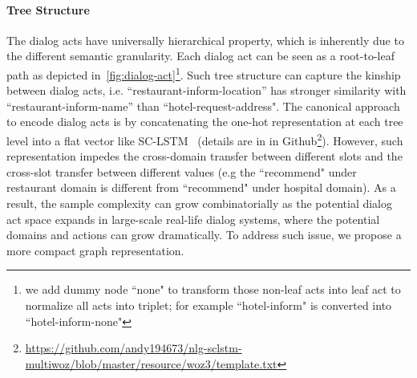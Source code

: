 \documentclass[11pt,a4paper]{article}
\begin{document}
\paragraph{Tree Structure}
The dialog acts
have universally hierarchical property, which is inherently due to the different semantic granularity. Each dialog act can be seen as a root-to-leaf path as depicted in~\autoref{fig:dialog-act}\footnote{we add dummy node ``none" to transform those non-leaf acts into leaf act to normalize all acts into triplet; for example ``hotel-inform" is converted into ``hotel-inform-none"}.  Such tree structure can capture the kinship between dialog acts, i.e. ``restaurant-inform-location'' has stronger similarity with ``restaurant-inform-name'' than ``hotel-request-address".  The canonical  approach to encode dialog acts is by concatenating the one-hot representation at each tree level into a flat vector like SC-LSTM~\cite{DBLP:conf/emnlp/WenGMSVY15,DBLP:conf/emnlp/BudzianowskiWTC18}  (details are in in Github\footnote{\url{https://github.com/andy194673/nlg-sclstm-multiwoz/blob/master/resource/woz3/template.txt}}). However, such representation impedes the cross-domain transfer between different slots and the cross-slot transfer between different values (e.g the ``recommend" under restaurant domain is different from ``recommend" under hospital domain). As a result, the sample complexity can grow combinatorially as the potential dialog act space expands in large-scale real-life dialog systems, where the potential domains and actions can grow dramatically. To address such issue, we propose a more compact graph representation.
\end{document}
